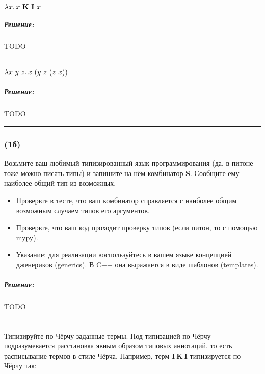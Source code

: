 \documentclass{article}
\newenvironment{proof}{\subparagraph{\hspace{-1em}Решение:\newline}}{\par\noindent\rule{\textwidth}{0.4pt}}
\newcommand{\term}[1]{\mathbf{#1}}
\newcommand{\ap}{~}
\begin{document}
    \paragraph{} $\lambda x\ldotp x \ap \term{K} \ap \term{I} \ap x$

    \begin{proof}
        TODO %
    \end{proof}

    \paragraph{} $\lambda x~y~z\ldotp x~(y~z~(z~x))$

    \begin{proof}
        TODO %
    \end{proof}

    \subsubsection{(1б)}

    Возьмите ваш любимый типизированный язык программирования (да, в питоне тоже можно писать типы) и запишите на нём комбинатор $\term{S}$.
    Сообщите ему наиболее общий тип из возможных.
    \begin{itemize}
        \item Проверьте в тесте, что ваш комбинатор справляется с наиболее общим возможным случаем типов его аргументов.
        \item Проверьте, что ваш код проходит проверку типов (если питон, то с помощью mypy).
        \item Указание: для реализации воспользуйтесь в вашем языке концепцией дженериков (generics).
        В C++ она выражается в виде шаблонов (templates).
    \end{itemize}

    \begin{proof}
        TODO %
    \end{proof}

    \subsubsection{}

    Типизируйте по Чёрчу заданные термы.
    Под типизацией по Чёрчу подразумевается
    расстановка явным образом типовых аннотаций, то есть расписывание термов в стиле
    Чёрча.
    Например, терм $\term{I} \ap \term{K} \ap \term{I}$ типизируется по Чёрчу
    так:
\end{document}
